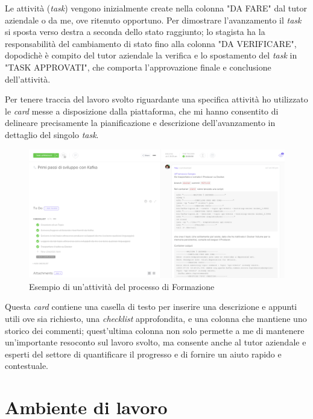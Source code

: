 Le attività (\textit{task}) vengono inizialmente create nella colonna "DA FARE" dal tutor aziendale o da me, ove ritenuto opportuno.
Per dimostrare l'avanzamento il \textit{task} si sposta verso destra a seconda dello stato raggiunto; lo stagista ha la responsabilità del cambiamento di stato fino alla colonna "DA VERIFICARE", dopodichè è compito del tutor aziendale la verifica e lo spostamento del \textit{task} in "TASK APPROVATI", che comporta l'approvazione finale e conclusione dell'attività.

Per tenere traccia del lavoro svolto riguardante una specifica attività ho utilizzato le \textit{card} messe a disposizione dalla piattaforma, che mi hanno consentito di delineare precisamente la pianificazione e descrizione dell'avanzamento in dettaglio del singolo \textit{task}.

\begin{figure}[H]
  \includegraphics[width=\textwidth]{images/clickup_task_v2.png}
  \caption{Esempio di un'attività del processo di Formazione}
\end{figure}

Questa \textit{card} contiene una casella di testo per inserire una descrizione e appunti utili ove sia richiesto, una \textit{checklist} approfondita, e una colonna che mantiene uno storico dei commenti; quest'ultima colonna non solo permette a me di mantenere un'importante resoconto sul lavoro svolto, ma consente anche al tutor aziendale e esperti del settore di quantificare il progresso e di fornire un aiuto rapido e contestuale.



\section{Ambiente di lavoro}

